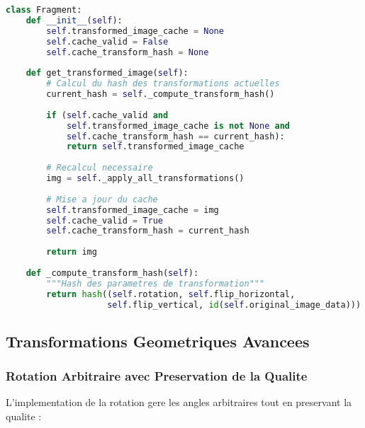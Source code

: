 \documentclass[12pt,a4paper]{article}
\begin{document}
\begin{lstlisting}[language=Python]
class Fragment:
    def __init__(self):
        self.transformed_image_cache = None
        self.cache_valid = False
        self.cache_transform_hash = None
    
    def get_transformed_image(self):
        # Calcul du hash des transformations actuelles
        current_hash = self._compute_transform_hash()
        
        if (self.cache_valid and 
            self.transformed_image_cache is not None and
            self.cache_transform_hash == current_hash):
            return self.transformed_image_cache
        
        # Recalcul necessaire
        img = self._apply_all_transformations()
        
        # Mise a jour du cache
        self.transformed_image_cache = img
        self.cache_valid = True
        self.cache_transform_hash = current_hash
        
        return img
    
    def _compute_transform_hash(self):
        """Hash des parametres de transformation"""
        return hash((self.rotation, self.flip_horizontal, 
                    self.flip_vertical, id(self.original_image_data)))
\end{lstlisting}

\subsection{Transformations Geometriques Avancees}

\subsubsection{Rotation Arbitraire avec Preservation de la Qualite}

L'implementation de la rotation gere les angles arbitraires tout en preservant la qualite :
\end{document}
